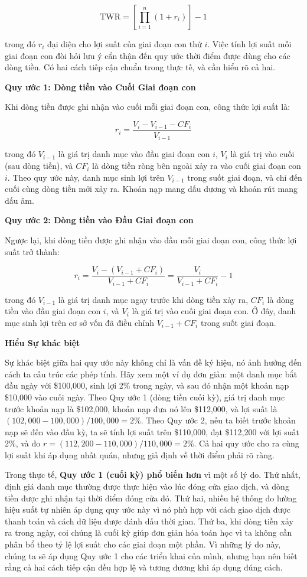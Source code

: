 $$
\text{TWR} = \left[\prod_{i=1}^{n}(1 + r_i)\right] - 1
$$

trong đó $r_i$ đại diện cho lợi suất của giai đoạn con thứ $i$. Việc tính lợi suất mỗi giai đoạn con đòi hỏi lưu ý cẩn thận đến quy ước thời điểm được dùng cho các dòng tiền. Có hai cách tiếp cận chuẩn trong thực tế, và cần hiểu rõ cả hai.

\textbf{Quy ước 1: Dòng tiền vào Cuối Giai đoạn con}

Khi dòng tiền được ghi nhận vào cuối mỗi giai đoạn con, công thức lợi suất là:

$$
r_i = \frac{V_i - V_{i-1} - CF_i}{V_{i-1}}
$$

trong đó $V_{i-1}$ là giá trị danh mục vào đầu giai đoạn con $i$, $V_i$ là giá trị vào cuối (sau dòng tiền), và $CF_i$ là dòng tiền ròng bên ngoài xảy ra vào cuối giai đoạn con $i$. Theo quy ước này, danh mục sinh lợi trên $V_{i-1}$ trong suốt giai đoạn, và chỉ đến cuối cùng dòng tiền mới xảy ra. Khoản nạp mang dấu dương và khoản rút mang dấu âm.

\textbf{Quy ước 2: Dòng tiền vào Đầu Giai đoạn con}

Ngược lại, khi dòng tiền được ghi nhận vào đầu mỗi giai đoạn con, công thức lợi suất trở thành:

$$
r_i = \frac{V_i - (V_{i-1} + CF_i)}{V_{i-1} + CF_i} = \frac{V_i}{V_{i-1} + CF_i} - 1
$$

trong đó $V_{i-1}$ là giá trị danh mục ngay trước khi dòng tiền xảy ra, $CF_i$ là dòng tiền vào đầu giai đoạn con $i$, và $V_i$ là giá trị vào cuối giai đoạn con. Ở đây, danh mục sinh lợi trên cơ sở vốn đã điều chỉnh $V_{i-1} + CF_i$ trong suốt giai đoạn.

\textbf{Hiểu Sự khác biệt}

Sự khác biệt giữa hai quy ước này không chỉ là vấn đề ký hiệu, nó ảnh hưởng đến cách ta cấu trúc các phép tính. Hãy xem một ví dụ đơn giản: một danh mục bắt đầu ngày với \$100,000, sinh lợi 2\% trong ngày, và sau đó nhận một khoản nạp \$10,000 vào cuối ngày. Theo Quy ước 1 (dòng tiền cuối kỳ), giá trị danh mục trước khoản nạp là \$102,000, khoản nạp đưa nó lên \$112,000, và lợi suất là $(102{,}000 - 100{,}000)/100{,}000 = 2\%$. Theo Quy ước 2, nếu ta biết trước khoản nạp sẽ đến vào đầu kỳ, ta sẽ tính lợi suất trên \$110,000, đạt \$112,200 với lợi suất 2\%, và đo $r = (112{,}200 - 110{,}000)/110{,}000 = 2\%$. Cả hai quy ước cho ra cùng lợi suất khi áp dụng nhất quán, nhưng giả định về thời điểm phải rõ ràng.

Trong thực tế, \textbf{Quy ước 1 (cuối kỳ) phổ biến hơn} vì một số lý do. Thứ nhất, định giá danh mục thường được thực hiện vào lúc đóng cửa giao dịch, và dòng tiền được ghi nhận tại thời điểm đóng cửa đó. Thứ hai, nhiều hệ thống đo lường hiệu suất tự nhiên áp dụng quy ước này vì nó phù hợp với cách giao dịch được thanh toán và cách dữ liệu được đánh dấu thời gian. Thứ ba, khi dòng tiền xảy ra trong ngày, coi chúng là cuối kỳ giúp đơn giản hóa toán học vì ta không cần phân bổ theo tỷ lệ lợi suất cho các giai đoạn một phần. Vì những lý do này, chúng ta sẽ áp dụng Quy ước 1 cho các triển khai của mình, nhưng bạn nên biết rằng cả hai cách tiếp cận đều hợp lệ và tương đương khi áp dụng đúng cách.

